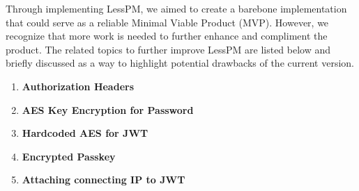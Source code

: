 Through implementing LessPM, we aimed to create a barebone implementation that
could serve as a reliable Minimal Viable Product (MVP).
However, we recognize that more work is needed to further enhance and compliment
the product.
The related topics to further improve LessPM are listed below and briefly
discussed as a way to highlight potential drawbacks of the current version.

    \begin{enumerate}[label=$\blacktriangleright$]
        \item \textbf{Authorization Headers}
        \item \textbf{AES Key Encryption for Password}
        \item \textbf{Hardcoded AES for JWT}
        \item \textbf{Encrypted Passkey}
        \item \textbf{Attaching connecting IP to JWT}
        \iffalse
        \item \textbf{Credential ID} \newline In its current implementation, LessPM supports a single registered
        authenticator per username to maintain a focused security approach.
        During registration, the server checks the database for an existing username similar to the incoming one
        and aborts the registration ceremony if a match is found.
        While WebAuthn permits users to have multiple authenticators, limiting this feature in the initial iteration of
        LessPM helps ensure a more controlled security environment.
        As the system evolves, considering the addition of support for multiple authenticators can be weighed against
        potential security risks and benefits.
        \fi
    \end{enumerate}